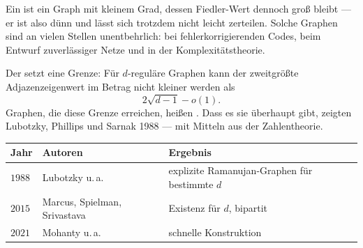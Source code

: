 \begin{forschung}
Ein  ist ein Graph mit kleinem Grad, dessen Fiedler-Wert dennoch groß bleibt --- er ist also dünn und lässt sich trotzdem nicht leicht zerteilen. Solche Graphen sind an vielen Stellen unentbehrlich: bei fehlerkorrigierenden Codes, beim Entwurf zuverlässiger Netze und in der Komplexitätstheorie.

Der  setzt eine Grenze: Für $d$-reguläre Graphen kann der zweitgrößte Adjazenzeigenwert im Betrag nicht kleiner werden als
\[ 2\sqrt{d-1} - o(1) . \]
Graphen, die diese Grenze erreichen, heißen . Dass es sie überhaupt gibt, zeigten Lubotzky, Phillips und Sarnak 1988 --- mit Mitteln aus der Zahlentheorie.

\begin{center}
{\small
\renewcommand{\arraystretch}{1.45}
\begin{tabular}{@{}P{1.6cm}P{2.6cm}P{3.6cm}@{}}
\toprule
\textbf{Jahr} & \textbf{Autoren} & \textbf{Ergebnis}\\
\midrule
$1988$ & Lubotzky u.\,a. & explizite Ramanujan-Graphen für bestimmte $d$\\
$2015$ & Marcus, Spielman, Srivastava & Existenz für  $d$, bipartit\\
$2021$ & Mohanty u.\,a. & schnelle Konstruktion\\
\bottomrule
\end{tabular}}
\end{center}

\begin{center}
\begin{minipage}{0.88\textwidth}
\end{minipage}
\end{center}
\end{forschung}

